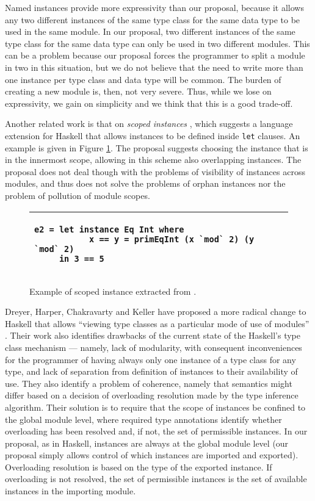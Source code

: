 \documentclass[msc]{ppgccufmg}
\begin{document}
Named instances provide more expressivity than our proposal, because it allows
any two different instances of the same type class for the same data type to be
used in the same module.  In our proposal, two different instances of the same
type class for the same data type can only be used in two different modules.
This can be a problem because our proposal forces the programmer to split a
module in two in this situation, but we do not believe that the need to
write more than one instance per type class and data type will be common. The
burden of creating a new module is, then, not very severe.  Thus, while we lose on expressivity,
we gain on simplicity and we think that this is a good trade-off.

Another related work is that on \emph{scoped instances} \citep{scoped}, which
suggests a language extension for Haskell that allows instances to be
defined inside \texttt{let} clauses. An example is given in Figure \ref{scoped}. The
proposal suggests choosing the instance that is in the innermost scope,
allowing in this scheme also overlapping instances. The proposal does not
deal though with the problems of visibility of instances across modules, and
thus does not solve the problems of orphan instances nor the problem of
pollution of module scopes.

\begin{figure}
\caption{Example of scoped instance extracted from \citep[section~6]{scoped}.\label{scoped}}
\begin{tabular}{|p{\textwidth}|}
\hline
\begin{verbatim}
e2 = let instance Eq Int where
           x == y = primEqInt (x `mod` 2) (y `mod` 2)
     in 3 == 5
\end{verbatim}
\\
\hline
\end{tabular}
\end{figure}

Dreyer, Harper, Chakravarty and Keller have proposed a more radical
change to Haskell that allows ``viewing type classes as a particular
mode of use of modules'' \citep{modular}. Their work also identifies
drawbacks of the current state of the Haskell's type class mechanism
--- namely, lack of modularity, with consequent inconveniences for the
programmer of having always only one instance of a type class for any
type, and lack of separation from definition of instances to their
availability of use. They also identify a problem of coherence, namely
that semantics might differ based on a decision of overloading
resolution made by the type inference algorithm. Their solution is to
require that the scope of instances be confined to the global module
level, where required type annotations identify whether overloading
has been resolved and, if not, the set of permissible instances. In
our proposal, as in Haskell, instances are always at the global module
level (our proposal simply allows control of which instances are
imported and exported). Overloading resolution is based on the type of
the exported instance. If overloading is not resolved, the set of
permissible instances is the set of available instances in the
importing module.
\end{document}

